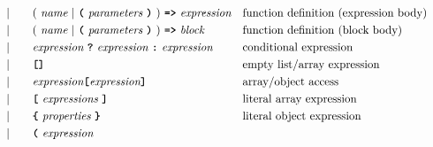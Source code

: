 \begin{alignat*}{9}
&&                       && |   &\quad &&   (\ \textit{name}\ | \
                                               \textbf{\texttt{(}}\ \textit{parameters}\ \textbf{\texttt{)}}\
                                            )\    
                                            \texttt{\textbf{=>}}\ \textit{expression}
                                                           && \textrm{function definition (expression body)}\\
&&                       && |   &\quad &&   (\ \textit{name}\ | \
                                               \textbf{\texttt{(}}\ \textit{parameters}\ \textbf{\texttt{)}}\
                                            )\    
                                            \texttt{\textbf{=>}}\ \textit{block}
                                                           && \textrm{function definition (block body)}\\
&&                       && |   &\quad &&   \textit{expression} \ \textbf{\texttt{?}}\ 
                                            \textit{expression}
                                            \ \textbf{\texttt{:}}\
                                            \textit{expression}\
                                                           && \textrm{conditional expression}\\
&&                       && |   &\quad &&   \textbf{\texttt{[]}}
                                                           && \textrm{empty list/array expression}\\
&&                       && |   &\quad && \textit{expression} \textbf{\texttt{[}}
                                          \textit{expression} \textbf{\texttt{]}}
                                                           && \textrm{array/object access} \\
&&                       && |   &\quad &&   \textbf{\texttt{[}}\ 
                                            \textit{expressions}\
                                            \textbf{\texttt{]}}
                                                           && \textrm{literal array expression}\\
&&                       && |   &\quad &&   \textbf{\texttt{\{}}\ 
                                            \textit{properties}\
                                            \textbf{\texttt{\}}}
                                                           && \textrm{literal object expression}\\
&&                       && |   &\quad &&  \textbf{\texttt{(}}\  \textit{expression} \ 

\end{alignat*}
